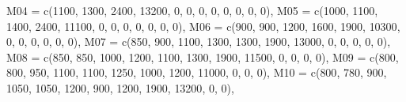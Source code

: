 \documentclass[
]{book}
\newenvironment{Shaded}{\begin{snugshade}}{\end{snugshade}}
\newcommand{\AttributeTok}[1]{\textcolor[rgb]{0.77,0.63,0.00}{#1}}
\newcommand{\DecValTok}[1]{\textcolor[rgb]{0.00,0.00,0.81}{#1}}
\newcommand{\FunctionTok}[1]{\textcolor[rgb]{0.00,0.00,0.00}{#1}}
\newcommand{\NormalTok}[1]{#1}
\begin{document}
\begin{Shaded}
\begin{Highlighting}[]
    \AttributeTok{M04 =} \FunctionTok{c}\NormalTok{(}\DecValTok{1100}\NormalTok{, }\DecValTok{1300}\NormalTok{, }\DecValTok{2400}\NormalTok{, }\DecValTok{13200}\NormalTok{, }\DecValTok{0}\NormalTok{, }\DecValTok{0}\NormalTok{, }\DecValTok{0}\NormalTok{, }\DecValTok{0}\NormalTok{, }\DecValTok{0}\NormalTok{, }\DecValTok{0}\NormalTok{, }\DecValTok{0}\NormalTok{, }\DecValTok{0}\NormalTok{),}
    \AttributeTok{M05 =} \FunctionTok{c}\NormalTok{(}\DecValTok{1000}\NormalTok{, }\DecValTok{1100}\NormalTok{, }\DecValTok{1400}\NormalTok{, }\DecValTok{2400}\NormalTok{, }\DecValTok{11100}\NormalTok{, }\DecValTok{0}\NormalTok{, }\DecValTok{0}\NormalTok{, }\DecValTok{0}\NormalTok{, }\DecValTok{0}\NormalTok{, }\DecValTok{0}\NormalTok{, }\DecValTok{0}\NormalTok{, }\DecValTok{0}\NormalTok{),}
    \AttributeTok{M06 =} \FunctionTok{c}\NormalTok{(}\DecValTok{900}\NormalTok{, }\DecValTok{900}\NormalTok{, }\DecValTok{1200}\NormalTok{, }\DecValTok{1600}\NormalTok{, }\DecValTok{1900}\NormalTok{, }\DecValTok{10300}\NormalTok{, }\DecValTok{0}\NormalTok{, }\DecValTok{0}\NormalTok{, }\DecValTok{0}\NormalTok{, }\DecValTok{0}\NormalTok{, }\DecValTok{0}\NormalTok{, }\DecValTok{0}\NormalTok{),}
    \AttributeTok{M07 =} \FunctionTok{c}\NormalTok{(}\DecValTok{850}\NormalTok{, }\DecValTok{900}\NormalTok{, }\DecValTok{1100}\NormalTok{, }\DecValTok{1300}\NormalTok{, }\DecValTok{1300}\NormalTok{, }\DecValTok{1900}\NormalTok{, }\DecValTok{13000}\NormalTok{, }\DecValTok{0}\NormalTok{, }\DecValTok{0}\NormalTok{, }\DecValTok{0}\NormalTok{, }\DecValTok{0}\NormalTok{, }\DecValTok{0}\NormalTok{),}
    \AttributeTok{M08 =} \FunctionTok{c}\NormalTok{(}\DecValTok{850}\NormalTok{, }\DecValTok{850}\NormalTok{, }\DecValTok{1000}\NormalTok{, }\DecValTok{1200}\NormalTok{, }\DecValTok{1100}\NormalTok{, }\DecValTok{1300}\NormalTok{, }\DecValTok{1900}\NormalTok{, }\DecValTok{11500}\NormalTok{, }\DecValTok{0}\NormalTok{, }\DecValTok{0}\NormalTok{, }\DecValTok{0}\NormalTok{, }\DecValTok{0}\NormalTok{),}
    \AttributeTok{M09 =} \FunctionTok{c}\NormalTok{(}\DecValTok{800}\NormalTok{, }\DecValTok{800}\NormalTok{, }\DecValTok{950}\NormalTok{, }\DecValTok{1100}\NormalTok{, }\DecValTok{1100}\NormalTok{, }\DecValTok{1250}\NormalTok{, }\DecValTok{1000}\NormalTok{, }\DecValTok{1200}\NormalTok{, }\DecValTok{11000}\NormalTok{, }\DecValTok{0}\NormalTok{, }\DecValTok{0}\NormalTok{, }\DecValTok{0}\NormalTok{),}
    \AttributeTok{M10 =} \FunctionTok{c}\NormalTok{(}\DecValTok{800}\NormalTok{, }\DecValTok{780}\NormalTok{, }\DecValTok{900}\NormalTok{, }\DecValTok{1050}\NormalTok{, }\DecValTok{1050}\NormalTok{, }\DecValTok{1200}\NormalTok{, }\DecValTok{900}\NormalTok{, }\DecValTok{1200}\NormalTok{, }\DecValTok{1900}\NormalTok{, }\DecValTok{13200}\NormalTok{, }\DecValTok{0}\NormalTok{, }\DecValTok{0}\NormalTok{),}

\end{Highlighting}
\end{Shaded}
\end{document}
